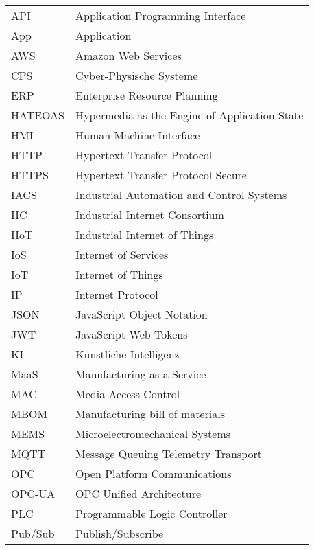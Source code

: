 \begin{tabular}{@{}l@{\qquad}l}
  API   & Application Programming Interface\\
  App   & Application\\
  AWS   & Amazon Web Services\\
  CPS   & Cyber-Physische Systeme\\
  ERP   & Enterprise Resource Planning\\
  HATEOAS & Hypermedia as the Engine of Application State\\
  HMI   & Human-Machine-Interface\\
  HTTP  & Hypertext Transfer Protocol\\
  HTTPS & Hypertext Transfer Protocol Secure\\
  IACS  & Industrial Automation and Control Systems\\
  IIC   & Industrial Internet Consortium\\
  IIoT  & Industrial Internet of Things\\
  IoS   & Internet of Services\\
  IoT   & Internet of Things\\
  IP    & Internet Protocol\\
  JSON  & JavaScript Object Notation\\
  JWT   & JavaScript Web Tokens\\
  KI    & Künstliche Intelligenz\\
  MaaS  & Manufacturing-as-a-Service\\
  MAC   & Media Access Control\\
  MBOM  & Manufacturing bill of materials\\
  MEMS  & Microelectromechanical Systems\\
  MQTT  & Message Queuing Telemetry Transport\\
  OPC   & Open Platform Communications\\
  OPC-UA & OPC Unified Architecture\\
  PLC   & Programmable Logic Controller\\
  Pub/Sub & Publish/Subscribe
\end{tabular}
\newpage
